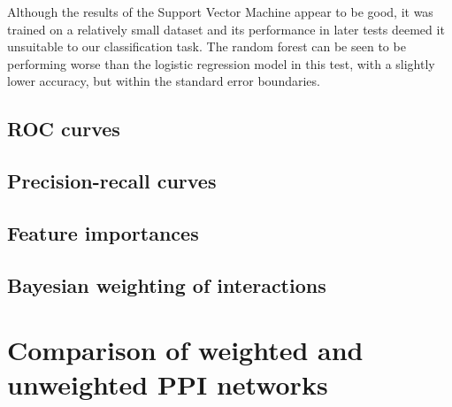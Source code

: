 Although the results of the Support Vector Machine appear to be good, it was trained on a relatively small dataset and its performance in later tests deemed it unsuitable to our classification task.
The random forest can be seen to be performing worse than the logistic regression model in this test, with a slightly lower accuracy, but within the standard error boundaries.

\subsection{ROC curves}





\subsection{Precision-recall curves}




\subsection{Feature importances}
\label{importances}




\subsection{Bayesian weighting of interactions}
\label{bayesresults}


\section{Comparison of weighted and unweighted PPI networks}


